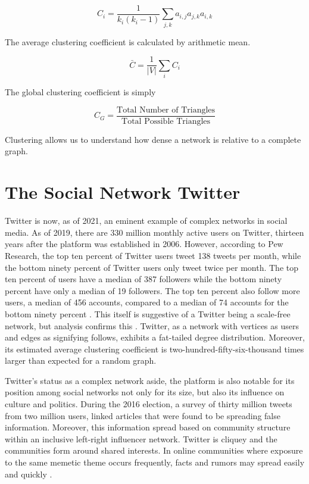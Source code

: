 $$
C_i =\frac{1}{k_i(k_i-1)} \sum_{j,k} a_{i,j}a_{j,k}a_{i,k}
$$

\noindent The average clustering coefficient is calculated by arithmetic mean.

$$
{\bar C} = \frac{1}{|V|}\sum_{i} C_i
$$

\noindent The global clustering coefficient is simply

$$
C_{G} = \frac{\text{Total Number of Triangles}}{\text{Total Possible Triangles}}
$$

\noindent Clustering allows us to understand how dense a network is relative to a complete graph. 

\section{The Social Network Twitter}
\label{section:Twitter}
Twitter is now, as of 2021, an eminent example of complex networks in social media.
As of 2019, there are 330 million monthly active users on Twitter, thirteen years after the platform was
established in 2006. However, according to Pew Research, the top ten percent of Twitter users tweet 138 
tweets per month, while the bottom ninety percent of Twitter users only tweet twice per month. The top ten percent of users
have a median of 387 followers while the bottom ninety percent have only a median of 19 followers. The top ten percent
also follow more users, a median of 456 accounts, compared to a median of 74 accounts for the bottom ninety percent \cite{wojcik2019sizing}.
This itself is suggestive of a Twitter being a scale-free network, but analysis confirms this \cite{Aparicio}. Twitter, as a network
with vertices as users and edges as signifying follows, exhibits a fat-tailed degree distribution. Moreover, its estimated
average clustering coefficient is two-hundred-fifty-six-thousand times larger than expected for a random graph.

Twitter's status as a complex network aside, the platform is also notable for its position among social networks not only for its size,
but also its influence on culture and politics. During the 2016 election, a survey of
thirty million tweets from two million users, linked articles that were found to be spreading
false information. Moreover, this information spread based on community structure within an inclusive left-right
influencer network. Twitter is cliquey and the communities form around 
shared interests. In online communities where exposure to the same memetic theme occurs frequently, 
facts and rumors may spread easily and quickly \cite{bessi}.

